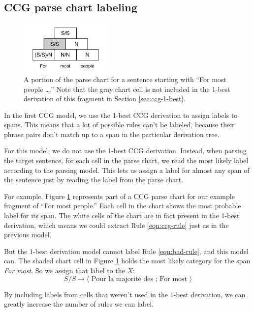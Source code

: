\documentclass[a4paper]{article}
\begin{document}
\subsection{CCG parse chart labeling}

\begin{figure}[t]
\centering
\includegraphics[width=0.4\textwidth]{figures/ccg-chart}
\caption{A portion of the parse chart for a sentence starting with ``For most people \ldots.'' Note that the gray chart cell is not included in the 1-best derivation of this fragment in Section \ref{sec:ccg-1-best}.\label{fig:chart}} 
\end{figure}

In the first CCG model, we use the 1-best CCG derivation to assign labels to spans. This means that a lot of possible rules can't be labeled, because their phrase pairs don't match up to a span in the particular derivation tree.

For this model, we do not use the 1-best CCG derivation. Instead, when parsing the target sentence, for each cell in the parse chart, we read the most likely label according to the parsing model. This lets us assign a label for almost any span of the sentence just by reading the label from the parse chart.

For example, Figure \ref{fig:chart} represents part of a CCG parse chart for our example fragment of ``For most people.'' Each cell in the chart shows the most probable label for its span. The white cells of the chart are in fact present in the 1-best derivation, which means we could extract Rule \ref{eqn:ccg-rule} just as in the previous model.

But the 1-best derivation model cannot label Rule \ref{eqn:bad-rule}, and this model can. The shaded chart cell in Figure \ref{fig:chart} holds the most likely category for the span {\em For most}. So we assign that label to the $X$:
\begin{equation*}
S/S \to \langle \textrm{ Pour la majorit\'{e} des ; For most } \rangle
\end{equation*}

By including labels from cells that weren't used in the 1-best derivation, we can greatly increase the number of rules we can label.
\end{document}
